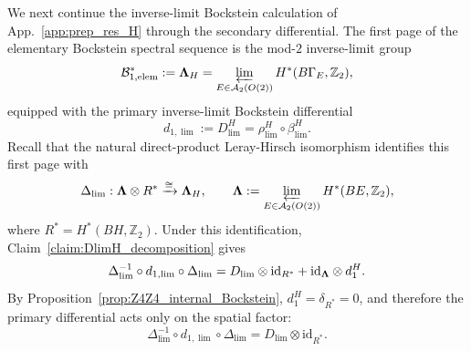 \documentclass[aps,prx,reprint,superscriptaddress,twocolumn,amsmath,amssymb,amsfonts, nofootinbib]{revtex4-2}
\theoremstyle{apsstyle}
\begin{document}
We next continue the inverse-limit Bockstein calculation of App.~\ref{app:prep_res_H} through the secondary differential. The first page of the elementary Bockstein spectral sequence is the mod-$2$ inverse-limit group 
\begin{equation} 
\mathcal B_{1,\mathrm{elem}}^{*} := {\bf\Lambda}_{H} = \varprojlim_{E\in\mathcal A_2(O(2))} H^{*}(B\Gamma_E,\mathbb Z_2), 
\label{eq:Z4Z4_elementary_B1} 
\end{equation} 
equipped with the primary inverse-limit Bockstein differential 
\begin{equation} 
d_{1,\lim} := D_{\lim}^{H} = \rho_{\lim}^{H}\circ\beta_{\lim}^{H}. 
\label{eq:Z4Z4_elementary_d1_def} 
\end{equation} 
Recall that the natural direct-product Leray-Hirsch isomorphism identifies this first page with 
\begin{equation} 
\Delta_{\lim}: {\bf\Lambda}\otimes R^{*} \xrightarrow{\cong} {\bf\Lambda}_{H}, \qquad {\bf\Lambda} := \varprojlim_{E\in\mathcal A_2(O(2))} H^{*}(BE,\mathbb Z_2), 
\label{eq:Z4Z4_limit_Kunneth} 
\end{equation} 
where $R^{*}=H^{*}(BH,\mathbb Z_2)$. Under this identification, Claim~\ref{claim:DlimH_decomposition} gives 
\begin{equation} 
\Delta_{\lim}^{-1} \circ d_{1,\lim}\circ \Delta_{\lim} = D_{\lim}\otimes\mathrm{id}_{R^{*}} + \mathrm{id}_{{\bf\Lambda}}\otimes d_1^{H}. 
\label{eq:Z4Z4_limit_d1_decomposition} 
\end{equation} 
By Proposition~\ref{prop:Z4Z4_internal_Bockstein}, $d_1^{H}=\delta_{R^{*}}=0$, and therefore the primary differential acts only on the spatial factor: 
\begin{equation} 
\Delta_{\lim}^{-1} \circ d_{1,\lim}\circ \Delta_{\lim} = D_{\lim}\otimes\mathrm{id}_{R^{*}}. 
\label{eq:Z4Z4_product_d1} 
\end{equation}
\end{document}
